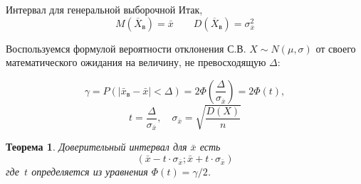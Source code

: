 \documentclass[unicode,11pt,notheorems,xcolor=table]{beamer}
\newtheorem{theorem}{Теорема}
\begin{document}
\begin{frame}[allowframebreaks]{Интервал для генеральной выборочной}{}
    Итак,   
    $$ 
        M(\overline{X}_\text{в} )= \bar{x} \qquad   D(\overline{X}_\text{в})=\sigma_{\bar x}^2
    $$
    \framebreak

     Воспользуемся формулой вероятности отклонения С.В. $X\sim N(\mu,\sigma)$ от своего математического ожидания на величину, не превосходящую $\Delta$:


    $$
       \gamma = P(|\bar{x}_\text{в} - \bar{x}| < \Delta) = 2\Phi \left(\frac{\Delta }{\sigma_{\bar x}}\right) = 2\Phi(t),
    $$
    $$
       t=\frac{\Delta}{\sigma_{\bar x}},\quad \sigma_{\bar x}=\sqrt{\frac{D(X)} n}
    $$



\framebreak
\begin{theorem}
    Доверительный интервал для  $\bar x$  
 есть  
 $$
    \left(\bar x-t\cdot \sigma _{\bar x};\bar x+t\cdot \sigma_{\bar x}\right)
 $$  
 где~$t$ определяется из уравнения $\Phi (t)= \gamma/2$. 
\end{theorem}

\bigskip
{\centering
{}
\par}

\end{frame}
\end{document}
